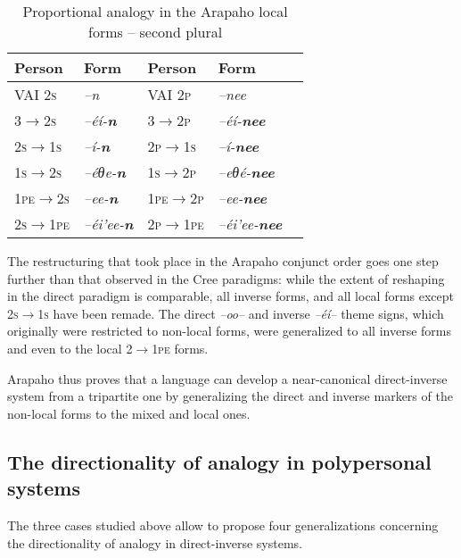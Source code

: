\documentclass[twoside,a4paper,11pt]{article}
\newcommand{\ipa}[1]{{\phon\textit{#1}}}
\newcommand{\grise}[1]{\cellcolor{lightgray}\textbf{#1}}
\newcommand{\Σ}{\greek{Σ}}
\begin{document}
 
 \begin{table}[H]
\caption{Proportional analogy in the Arapaho local forms -- second plural}
\centering \label{tab:arapaho.analogy.local2}
\begin{tabular}{lllll}
\toprule
 Person &  Form &  Person &  Form\\
\midrule 
 VAI \textsc{2s} & \ipa{--n} &  VAI \textsc{2p} & \ipa{--nee} \\
  \textsc{3$\rightarrow$2s} & \ipa{--éí-\textbf{n}} &   \textsc{3$\rightarrow$2p} & \ipa{--éí-\textbf{nee}} \\
\textsc{2s$\rightarrow$1s}&  \ipa{--í-\textbf{n}} & \textsc{2p$\rightarrow$1s}&  \ipa{--í-\textbf{nee}} \\
   \midrule 
    \textsc{1s$\rightarrow$2s}& \ipa{--éθe-\textbf{n}} & \textsc{1s$\rightarrow$2p}&\ipa{--eθé-\textbf{nee}} \grise{} \\
    \textsc{1pe$\rightarrow$2s}&\ipa{--ee-\textbf{n}} & \textsc{1pe$\rightarrow$2p}&\ipa{--ee-\textbf{nee}}\grise{} \\
    \textsc{2s$\rightarrow$1pe}& \ipa{--éi'ee-\textbf{n}}&\textsc{2p$\rightarrow$1pe}&\ipa{--éi'ee-\textbf{nee}}\grise{}\\
\bottomrule
\end{tabular}
\end{table}
 
The restructuring that took place in the Arapaho conjunct order goes one step further than that observed in the Cree paradigms: while the extent of reshaping in the direct paradigm is comparable, all inverse forms, and   all local forms except \textsc{2s$\rightarrow$1s} have been remade. The direct \ipa{--oo--} and inverse \ipa{--éí--} theme signs, which originally were restricted to non-local forms, were generalized to all inverse forms and even to the local \textsc{2$\rightarrow$1pe} forms.

Arapaho thus proves that a language can develop a near-canonical direct-inverse system from a tripartite one by generalizing the direct and inverse markers of the non-local forms to the mixed and local ones. 

\subsection{The directionality of analogy in polypersonal systems}

The three cases studied above allow to propose four generalizations concerning the directionality of analogy in direct-inverse systems.
 
\end{document}
